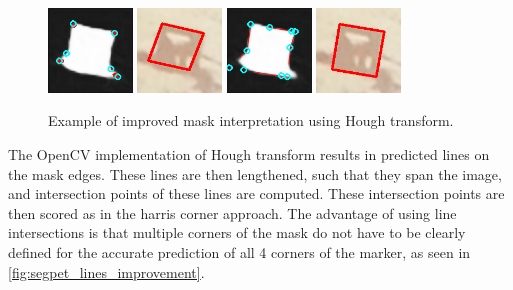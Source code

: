 \documentclass[10pt]{book}
\newcommand{\figureref}[1]{\autoref{#1}}
\begin{document}
\begin{figure}
  \centering
     {\includegraphics[width=0.2\textwidth]{image/segpet_mask_2_pred_corners}}
     {\includegraphics[width=0.2\textwidth]{image/segpet_mask_2_pred_rect}}
     {\includegraphics[width=0.2\textwidth]{image/segpet_mask_2_pred_intersects}}
     {\includegraphics[width=0.2\textwidth]{image/segpet_mask_2_lines_pred_rect}}
  \caption{Example of improved mask interpretation using Hough transform.}
  \label{fig:segpet_lines_improvement}
\end{figure}

The \ac{OpenCV} implementation of Hough transform results in predicted lines on the mask edges. These lines are then lengthened, such that they span the image, and intersection points of these lines are computed. These intersection points are then scored as in the harris corner approach. The advantage of using line intersections is that multiple corners of the mask do not have to be clearly defined for the accurate prediction of all 4 corners of the marker, as seen in \figureref{fig:segpet_lines_improvement}. %
\end{document}
